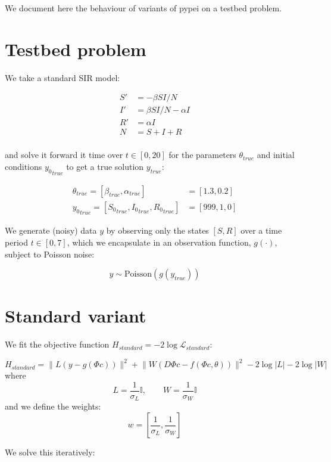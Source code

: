 We document here the behaviour of variants of pypei on a testbed
problem.

\hypertarget{testbed-problem}{%
\section{Testbed problem}\label{testbed-problem}}

We take a standard SIR model:

\[\begin{aligned}
S' &= -\beta SI/N \\
I' &= \beta SI/N - \alpha I\\
R' &= \alpha I\\
N &= S + I + R\\
\end{aligned}\]

and solve it forward it time over \(t \in [0, 20]\) for the parameters
\(\theta_{true}\) and initial conditions \({y_0}_{true}\) to get a true
solution \(y_{true}\):

\[\begin{aligned}
\theta_{true} = [\beta_{true}, \alpha_{true}] &= [1.3, 0.2]\\
{y_0}_{true} = [{S_0}_{true}, {I_0}_{true}, {R_0}_{true}] &= [999, 1, 0]
\end{aligned}\]

We generate (noisy) data \(y\) by observing only the states \([S, R]\)
over a time period \(t \in [0, 7]\), which we encapsulate in an
observation function, \(g(\cdot)\), subject to Poisson noise:

\[y \sim \text{Poisson}(g(y_{true}))\]

\hypertarget{standard-variant}{%
\section{Standard variant}\label{standard-variant}}

We fit the objective function
\(H_{standard} = -2\log\mathcal{L}_{standard}\):

\[
H_{standard} = \lVert L(y - g(\Phi c))\rVert^2 + \lVert W(D\Phi c - f(\Phi c, \theta)) \rVert^2 - 2\log{|L|} - 2\log{|W|}
\] where
\[L = \frac{1}{\sigma_L} \mathbb{I},\qquad W = \frac{1}{\sigma_W} \mathbb{I}\]
and we define the weights:
\[w = \left[\frac{1}{\sigma_L}, \frac{1}{\sigma_W}\right]\]

We solve this iteratively:

